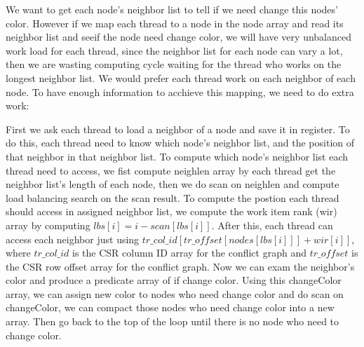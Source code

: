\documentclass[12pt] {article}
\begin{document}
\begin{itemize}
We want to get each node's neighbor list to tell if we need change this nodes' color. However if we map each thread to a node in the node array and read its neighbor list and seeif the node need change color, we will have very unbalanced work load for each thread, since the neighbor list for each node can vary a lot, then we are wasting computing cycle waiting for the thread who works on the longest neighbor list. We would prefer each thread work on each neighbor of each node. To have enough information to acchieve this mapping, we need to do extra work:
\begin{figure}[!tbh]
\centering        
   \caption{ }
   \label{fig:fig4}
\end{figure} 

First we ask each thread to load a neighbor of a node and save it in register. To do this, each thread need to know which node's neighbor list, and the position of that neighbor in that neighbor list. To compute which node's neighbor list each thread need to access, we fist compute neighlen array by each thread get the neighbor list's length of each node, then we do scan on neighlen and compute load balancing search on the scan result. To compute the postion each thread should access in assigned neighbor list, we compute the work item rank (wir) array by computing $lbs[i]=i-scan[lbs[i]]$. After this, each thread can access each neighbor just using $tr\_col\_id[tr\_offset[nodes[lbs[i]]] + wir[i]]$, where $tr\_col\_id$ is the CSR column ID array for the conflict graph and $tr\_offset$ is the CSR row offset array for the conflict graph. Now we can exam the neighbor's color and produce a predicate array of if change color. Using this changeColor array, we can assign new color to nodes who need change color and do scan on changeColor, we can compact those nodes who need change color into a new array. Then go back to the top of the loop until there is no node who need to change color.

\end{itemize}
\end{document}
